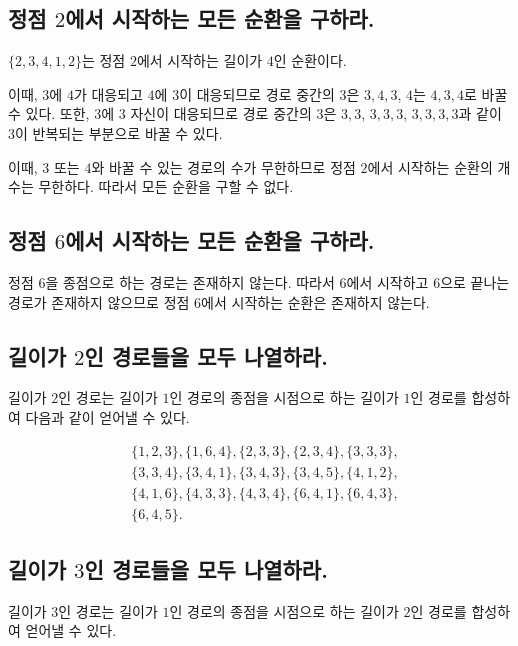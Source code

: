 \documentclass{oblivoir}
\begin{document}
\subsection{정점 $2$에서 시작하는 모든 순환을 구하라.}

$\{2,3,4,1,2\}$는 정점 $2$에서 시작하는 길이가 $4$인 순환이다.

이때, $3$에 $4$가 대응되고 $4$에 $3$이 대응되므로
경로 중간의 $3$은 $3,4,3$, $4$는 $4,3,4$로 바꿀 수 있다.
또한, $3$에 $3$ 자신이 대응되므로
경로 중간의 $3$은 $3,3$, $3,3,3$, $3,3,3,3$과 같이
3이 반복되는 부분으로 바꿀 수 있다.

이때, $3$ 또는 $4$와 바꿀 수 있는 경로의 수가 무한하므로
정점 $2$에서 시작하는 순환의 개수는 무한하다.
따라서 모든 순환을 구할 수 없다.

\subsection{정점 $6$에서 시작하는 모든 순환을 구하라.}

정점 $6$을 종점으로 하는 경로는 존재하지 않는다.
따라서 $6$에서 시작하고 $6$으로 끝나는 경로가 존재하지 않으므로
정점 $6$에서 시작하는 순환은 존재하지 않는다.

\subsection{길이가 $2$인 경로들을 모두 나열하라.}

길이가 $2$인 경로는 길이가 $1$인 경로의 종점을 시점으로 하는
길이가 $1$인 경로를 합성하여 다음과 같이 얻어낼 수 있다.

\begin{equation}\label{eq:2lp}
    \begin{aligned}
        &\{1,2,3\}, \{1,6,4\}, \{2,3,3\}, \{2,3,4\}, \{3,3,3\}, \\
        &\{3,3,4\}, \{3,4,1\}, \{3,4,3\}, \{3,4,5\}, \{4,1,2\}, \\
        &\{4,1,6\}, \{4,3,3\}, \{4,3,4\}, \{6,4,1\}, \{6,4,3\}, \\
        &\{6,4,5\}.
    \end{aligned}
\end{equation}

\subsection{길이가 $3$인 경로들을 모두 나열하라.}

길이가 $3$인 경로는 길이가 $1$인 경로의 종점을 시점으로 하는
길이가 $2$인 경로를 합성하여 얻어낼 수 있다.
\end{document}
